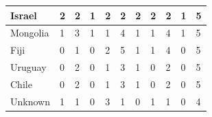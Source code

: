 \documentclass[12pt]{article}  %
\begin{document}
\begin{subappendices}
\begin{longtable}{|l|l|l|l|l|l|l|l|l|l|l|}
	\hline
	Israel                                                         & 2                                                 & 2                                                 & 1                                                 & 2                                                 & 2                                                 & 2                                                 & 2    & 2      & 1      & 5      \\ 
	\hline
	Mongolia                                                       & 1                                                 & 3                                                 & 1                                                 & 1                                                 & 4                                                 & 1                                                 & 1    & 4      & 1      & 5      \\ 
	\hline
	Fiji                                                           & 0                                                 & 1                                                 & 0                                                 & 2                                                 & 5                                                 & 1                                                 & 1    & 4      & 0      & 5      \\ 
	\hline
	Uruguay                                                        & 0                                                 & 2                                                 & 0                                                 & 1                                                 & 3                                                 & 1                                                 & 0    & 2      & 0      & 5      \\ 
	\hline
	Chile                                                          & 0                                                 & 2                                                 & 0                                                 & 1                                                 & 3                                                 & 1                                                 & 0    & 2      & 0      & 5      \\ 
	\hline
	Unknown                                                        & 1                                                 & 1                                                 & 0                                                 & 3                                                 & 1                                                 & 0                                                 & 1    & 1      & 0      & 4      \\ 

\end{longtable}
\end{subappendices}
\end{document}
